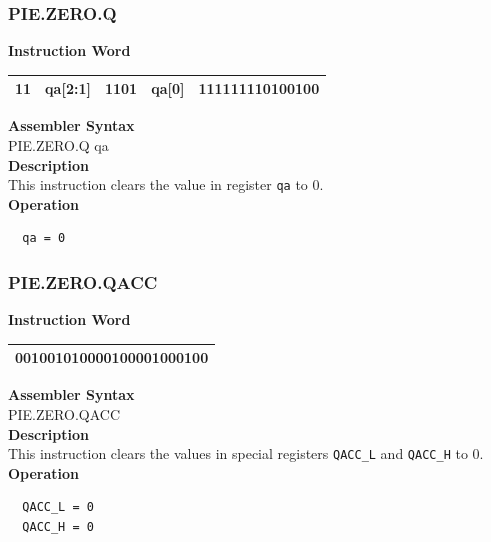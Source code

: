 \newpage
\subsubsection{PIE.ZERO.Q}\label{instruction:PIEZEROQ}
\setlength\tabcolsep{6pt}
\textbf{Instruction Word} \\
\begin{tabular}{|c|c|c|c|c|}
	\hline
	11 & qa[2:1] & 1101 & qa[0] & 111111110100100 \\
	\hline
\end{tabular}

\textbf{Assembler Syntax} \\
PIE.ZERO.Q qa \\
\textbf{Description} \\
This instruction clears the value in register \lstinline{qa} to 0.\\
\textbf{Operation}
\begin{lstlisting}
  qa = 0
\end{lstlisting}

\newpage
\subsubsection{PIE.ZERO.QACC}\label{instruction:PIEZEROQACC}
\setlength\tabcolsep{6pt}
\textbf{Instruction Word} \\
\begin{tabular}{|c|}
	\hline
	001001010000100001000100 \\
	\hline
\end{tabular}

\textbf{Assembler Syntax} \\
PIE.ZERO.QACC  \\
\textbf{Description} \\
This instruction clears the values in special registers \lstinline{QACC_L} and \lstinline{QACC_H} to 0.\\
\textbf{Operation}
\begin{lstlisting}
  QACC_L = 0
  QACC_H = 0
\end{lstlisting}
